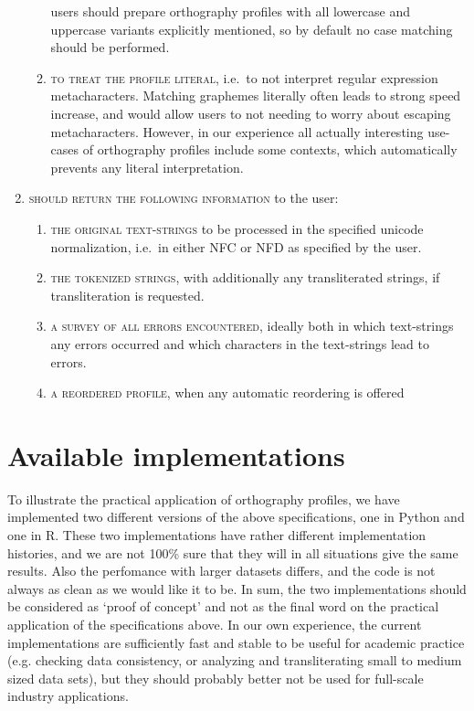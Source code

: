 \begin{enumerate}
\begin{enumerate}
        users should prepare orthography profiles with all lowercase and
        uppercase variants explicitly mentioned, so by default no case matching
        should be performed. 
		\item \textsc{to treat the profile literal}, i.e.~to not interpret regular
        expression metacharacters. Matching graphemes literally often leads to
        strong speed increase, and would allow users to not needing to worry
        about escaping metacharacters. However, in our experience all actually
        interesting use-cases of orthography profiles include some contexts,
        which automatically prevents any literal interpretation.
    \end{enumerate}
	\item \textsc{should return the following information} to the user:
	\begin{enumerate}
		\def\labelenumii{C\arabic{enumii}.} \setcounter{enumii}{8} 
		\item \textsc{the original text-strings} to be processed in the specified
        unicode normalization, i.e.~in either NFC or NFD as specified by the
        user. 
		\item \textsc{the tokenized strings}, with additionally any transliterated
        strings, if transliteration is requested. 
		\item \textsc{a survey of all errors encountered}, ideally both in which
        text-strings any errors occurred and which characters in the
        text-strings lead to errors. 
		\item \textsc{a reordered profile}, when any automatic reordering is offered 
	\end{enumerate}
\end{enumerate}

\section{Available implementations}

To illustrate the practical application of orthography profiles, we have
implemented two different versions of the above specifications, one in Python
and one in R. These two implementations have rather different implementation
histories, and we are not 100\% sure that they will in all situations give the
same results. Also the perfomance with larger datasets differs, and the code is
not always as clean as we would like it to be. In sum, the two implementations
should be considered as `proof of concept' and not as the final word on the
practical application of the specifications above. In our own experience, the
current implementations are sufficiently fast and stable to be useful for
academic practice (e.g. checking data consistency, or analyzing and
transliterating small to medium sized data sets), but they should probably
better not be used for full-scale industry applications.

